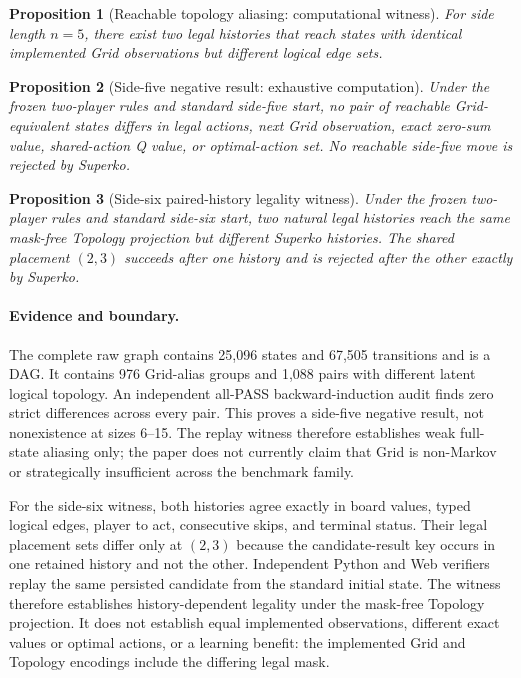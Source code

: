 \documentclass{article}
\newtheorem{proposition}{Proposition}
\begin{document}
\begin{proposition}[Reachable topology aliasing: computational witness]
For side length $n=5$, there exist two legal histories that reach states with
identical implemented Grid observations but different logical edge sets.
\end{proposition}

\begin{proposition}[Side-five negative result: exhaustive computation]
Under the frozen two-player rules and standard side-five start, no pair of
reachable Grid-equivalent states differs in legal actions, next Grid
observation, exact zero-sum value, shared-action Q value, or optimal-action set.
No reachable side-five move is rejected by Superko.
\end{proposition}

\begin{proposition}[Side-six paired-history legality witness]
Under the frozen two-player rules and standard side-six start, two natural
legal histories reach the same mask-free Topology projection but different
Superko histories. The shared placement $(2,3)$ succeeds after one history and
is rejected after the other exactly by Superko.
\end{proposition}

\paragraph{Evidence and boundary.}
The complete raw graph contains 25,096 states and 67,505 transitions and is a
DAG. It contains 976 Grid-alias groups and 1,088 pairs with different latent
logical topology. An independent all-PASS backward-induction audit finds zero
strict differences across every pair. This proves a side-five negative result,
not nonexistence at sizes 6--15. The replay witness therefore establishes weak
full-state aliasing only; the paper does not currently claim that Grid is
non-Markov or strategically insufficient across the benchmark family.

For the side-six witness, both histories agree exactly in board values, typed
logical edges, player to act, consecutive skips, and terminal status. Their
legal placement sets differ only at $(2,3)$ because the candidate-result key
occurs in one retained history and not the other. Independent Python and Web
verifiers replay the same persisted candidate from the standard initial state.
The witness therefore establishes history-dependent legality under the
mask-free Topology projection. It does not establish equal implemented
observations, different exact values or optimal actions, or a learning benefit:
the implemented Grid and Topology encodings include the differing legal mask.
\end{document}
